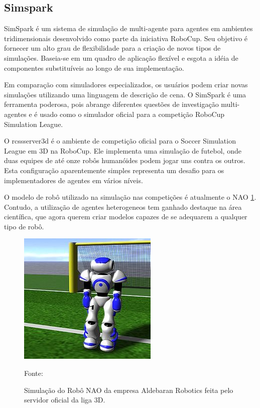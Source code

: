 \subsection{Simspark}

SimSpark \cite{simspark} é um sistema de simulação de multi-agente para agentes em ambientes tridimensionais desenvolvido como
parte da iniciativa RoboCup. Seu objetivo é fornecer um alto grau de flexibilidade para a criação de novos tipos de simulações. 
Baseia-se em um quadro de aplicação flexível e esgota a idéia de componentes substituíveis ao longo de sua implementação. 

Em comparação com simuladores especializados, os usuários podem criar novas simulações utilizando uma linguagem de descrição de
cena. O SimSpark é uma ferramenta poderosa, pois abrange diferentes questões de investigação multi-agentes e é usado como o 
simulador oficial para a competição RoboCup Simulation League.

O rcssserver3d é o ambiente de competição oficial para o Soccer Simulation League em 3D na RoboCup. Ele implementa uma simulação
de futebol, onde duas equipes de até onze robôs humanóides podem jogar uns contra os outros. Esta configuração aparentemente 
simples representa um desafio para os implementadores de agentes em vários níveis. 

O modelo de robô utilizado na simulação nas competições é atualmente o NAO \ref{fig:naoColorido}. Contudo, a utilização de agentes
heterogeneos tem ganhado destaque na área científica, que agora querem criar modelos capazes de se adequarem a qualquer tipo de 
robô.

\begin{figure}[h]

\centering

\includegraphics[scale=0.8]{figuras/naoColorido.jpg}

\caption{Simulação do Robô NAO da empresa Aldebaran Robotics feita pelo servidor oficial da liga 3D.} Fonte: \cite{SimulationLeague} \label{fig:naoColorido}

\end{figure}
\FloatBarrier
              
